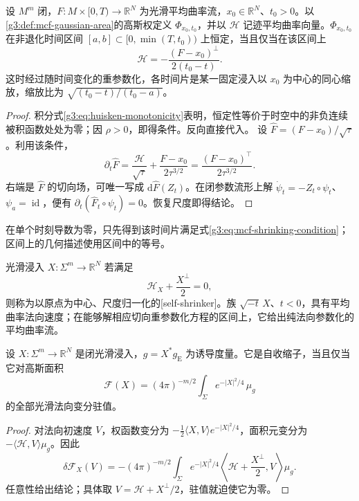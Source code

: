 \begin{proposition}\label{g3:prop:mcf-monotonicity-equality}
	设 \(M^m\) 闭，\(F:M\times[0,T)\to\mathbb R^N\) 为光滑平均曲率流，\(x_0\in\mathbb R^N\)、\(t_0>0\)。以\cref{g3:def:mcf-gaussian-area}的高斯权定义 \(\Phi_{x_0,t_0}\)，并以 \(\mathcal H\) 记迹平均曲率向量。\(\Phi_{x_0,t_0}\) 在非退化时间区间 \([a,b]\subset[0,\min(T,t_0))\) 上恒定，当且仅当在该区间上
	\begin{equation}\label{g3:eq:mcf-shrinking-condition}
		\mathcal H=-\frac{(F-x_0)^\perp}{2(t_0-t)}.
	\end{equation}
	这时经过随时间变化的重参数化，各时间片是某一固定浸入以 \(x_0\) 为中心的同心缩放，缩放比为 \(\sqrt{(t_0-t)/(t_0-a)}\)。
\end{proposition}
\begin{proof}
	积分式\eqref{g3:eq:huisken-monotonicity}表明，恒定性等价于时空中的非负连续被积函数处处为零；因 \(\rho>0\)，即得条件。反向直接代入。
	设 \(\widehat F=(F-x_0)/\sqrt\tau\)。利用该条件，
	\[
		\partial_t\widehat F
		=\frac{\mathcal H}{\sqrt\tau}+\frac{F-x_0}{2\tau^{3/2}}
		=\frac{(F-x_0)^\top}{2\tau^{3/2}}.
	\]
	右端是 \(\widehat F\) 的切向场，可唯一写成 \(\mathrm d\widehat F(Z_t)\)。在闭参数流形上解 \(\dot\psi_t=-Z_t\circ\psi_t\)、\(\psi_a=\operatorname{id}\)，便有 \(\partial_t(\widehat F_t\circ\psi_t)=0\)。恢复尺度即得结论。
\end{proof}

在单个时刻导数为零，只先得到该时间片满足式\eqref{g3:eq:mcf-shrinking-condition}；区间上的几何描述使用区间中的等号。

\begin{definition}\label{g3:def:mcf-self-shrinker}
	光滑浸入 \(X:\Sigma^m\to\mathbb R^N\) 若满足
	\[
		\mathcal H_X+\frac{X^\perp}{2}=0,
	\]
	则称为以原点为中心、尺度归一化的[self-shrinker]。族 \(\sqrt{-t}\,X\)、\(t<0\)，具有平均曲率法向速度；在能够解相应切向重参数化方程的区间上，它给出纯法向参数化的平均曲率流。
\end{definition}

\begin{proposition}\label{g3:prop:mcf-gaussian-critical}
	设 \(X:\Sigma^m\to\mathbb R^N\) 是闭光滑浸入，\(g=X^*g_{\mathrm E}\) 为诱导度量。它是自收缩子，当且仅当它对高斯面积
	\[
		\mathcal F(X)=(4\pi)^{-m/2}\int_\Sigma e^{-|X|^2/4}\,\mu_g
	\]
	的全部光滑法向变分驻值。
\end{proposition}
\begin{proof}
	对法向初速度 \(V\)，权函数变分为 \(-\tfrac12\langle X,V\rangle e^{-|X|^2/4}\)，面积元变分为 \(-\langle\mathcal H,V\rangle\mu_g\)。因此
	\[
		\delta\mathcal F_X(V)
		=-(4\pi)^{-m/2}\int_\Sigma e^{-|X|^2/4}
		\left\langle\mathcal H+\frac{X^\perp}{2},V\right\rangle\mu_g.
	\]
	任意性给出结论；具体取 \(V=\mathcal H+X^\perp/2\)，驻值就迫使它为零。
\end{proof}

